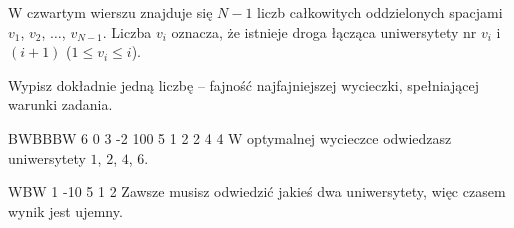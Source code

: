 W czwartym wierszu znajduje się $N - 1$ liczb całkowitych oddzielonych spacjami $v_1$, $v_2$, $\ldots$, $v_{N-1}$.
Liczba $v_i$ oznacza, że istnieje droga łącząca uniwersytety nr $v_i$ i $(i + 1)$ ($1 \le v_i \le i$).


Wypisz dokładnie jedną liczbę -- fajność najfajniejszej wycieczki, spełniającej warunki zadania.


BWBBBW
6 0 3 -2 100 5
1 2 2 4 4
\sampleCOMMENT
W optymalnej wycieczce odwiedzasz uniwersytety $1$, $2$, $4$, $6$.
\sampleEND

WBW
1 -10 5
1 2
\sampleCOMMENT
Zawsze musisz odwiedzić jakieś dwa uniwersytety,
	więc czasem wynik jest ujemny.
\sampleEND



